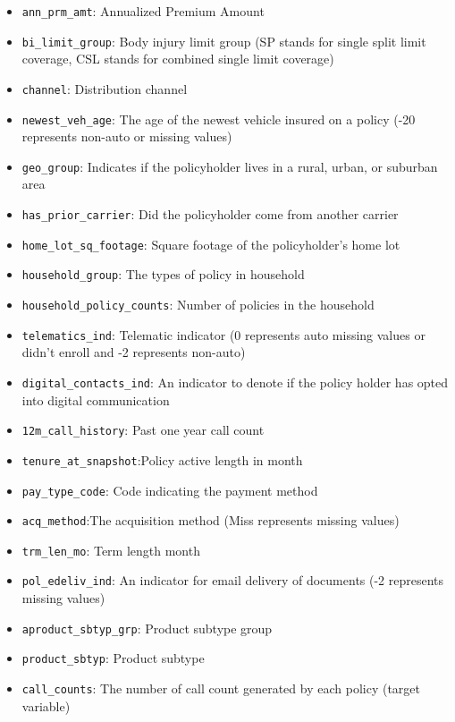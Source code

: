 \documentclass[
  10pt,
  letterpaper,
  twocolumn]{article}
\begin{document}
\begin{itemize}
\item
  \texttt{ann\_prm\_amt}: Annualized Premium Amount
\item
  \texttt{bi\_limit\_group}: Body injury limit group (SP stands for
  single split limit coverage, CSL stands for combined single limit
  coverage)
\item
  \texttt{channel}: Distribution channel
\item
  \texttt{newest\_veh\_age}: The age of the newest vehicle insured on a
  policy (-20 represents non-auto or missing values)
\item
  \texttt{geo\_group}: Indicates if the policyholder lives in a rural,
  urban, or suburban area
\item
  \texttt{has\_prior\_carrier}: Did the policyholder come from another
  carrier
\item
  \texttt{home\_lot\_sq\_footage}: Square footage of the policyholder's
  home lot
\item
  \texttt{household\_group}: The types of policy in household
\item
  \texttt{household\_policy\_counts}: Number of policies in the
  household
\item
  \texttt{telematics\_ind}: Telematic indicator (0 represents auto
  missing values or didn't enroll and -2 represents non-auto)
\item
  \texttt{digital\_contacts\_ind}: An indicator to denote if the policy
  holder has opted into digital communication
\item
  \texttt{12m\_call\_history}: Past one year call count
\item
  \texttt{tenure\_at\_snapshot}:Policy active length in month
\item
  \texttt{pay\_type\_code}: Code indicating the payment method
\item
  \texttt{acq\_method}:The acquisition method (Miss represents missing
  values)
\item
  \texttt{trm\_len\_mo}: Term length month
\item
  \texttt{pol\_edeliv\_ind}: An indicator for email delivery of
  documents (-2 represents missing values)
\item
  \texttt{aproduct\_sbtyp\_grp}: Product subtype group
\item
  \texttt{product\_sbtyp}: Product subtype
\item
  \texttt{call\_counts}: The number of call count generated by each
  policy (target variable)
\end{itemize}
\end{document}
